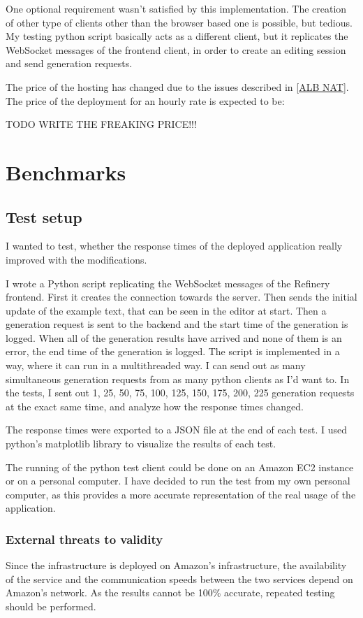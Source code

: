 	One optional requirement wasn't satisfied by this implementation. The creation of other type of clients other than the browser
	based one is possible, but tedious. My testing python script basically acts as a different client, but it replicates the WebSocket
	messages of the frontend client, in order to create an editing session and send generation requests.

	The price of the hosting has changed due to the issues described in \ref{ALB NAT}. The price of the deployment for an hourly rate 
	is expected to be:

	TODO WRITE THE FREAKING PRICE!!!

	\section{Benchmarks}
		\subsection{Test setup}
		I wanted to test, whether the response times of the deployed application really improved with the modifications.

		I wrote a Python script replicating the WebSocket messages of the Refinery frontend. First it creates the connection
		towards the server. Then sends the initial update
		of the example text, that can be seen in the editor at start. Then a generation request is sent to the backend and the start time of the generation
		is logged. When all of the generation results have arrived and none of them is an error, the end time of the generation is logged. 
		The script is implemented in a way, where it can run in a multithreaded way. I can send out as many simultaneous generation requests 
		from as many python clients as I'd want to. In the tests, I sent out 1, 25, 50, 75, 100, 125, 150, 175, 200, 225 generation requests
		at the exact same time, and analyze how the response times changed.

		The response times were exported to a JSON file at the end of each test. I used python's matplotlib library to visualize the results
		of each test.

		The running of the python test client could be done on an Amazon EC2 instance or on a personal computer. I have decided to run the test 
		from my own personal computer, as this provides a more accurate representation of the real usage of the application.

		\subsubsection{External threats to validity}
			Since the infrastructure is deployed on Amazon's infrastructure, the availability of the service and the communication speeds between the two services 
			depend on Amazon's network. As the results cannot be 100\% accurate, repeated testing should be
			performed.

